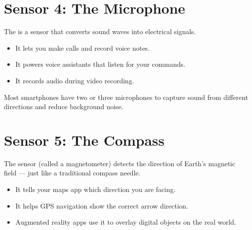 \section*{Sensor 4: The Microphone}

The  is a sensor that converts sound waves into electrical signals.

\begin{itemize}
  \item It lets you make calls and record voice notes.
  \item It powers voice assistants that listen for your commands.
  \item It records audio during video recording.
\end{itemize}

Most smartphones have two or three microphones to capture sound from
different directions and reduce background noise.

\sectionrule

\section*{Sensor 5: The Compass}

The  sensor (called a magnetometer) detects the direction
of Earth's magnetic field — just like a traditional compass needle.

\begin{itemize}
  \item It tells your maps app which direction you are facing.
  \item It helps GPS navigation show the correct arrow direction.
  \item Augmented reality apps use it to overlay digital objects on the real world.
\end{itemize}

\sectionrule

